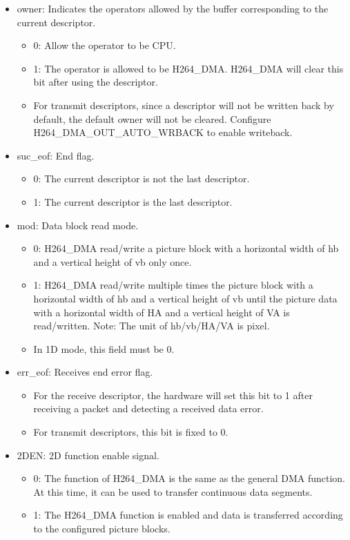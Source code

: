 \documentclass[main\_\_EN.tex]{subfiles}
\begin{document}
\begin{itemize}
\item owner: Indicates the operators allowed by the buffer corresponding to the current descriptor.
    \begin{itemize}
    \item 0: Allow the operator to be CPU.
    \item 1: The operator is allowed to be H264\_DMA. H264\_DMA will clear this bit after using the descriptor.
    \item For transmit descriptors, since a descriptor will not be written back by default, the default owner will not be cleared. Configure H264\_DMA\_OUT\_AUTO\_WRBACK to enable writeback.
    \end{itemize}

\item suc\_eof: End flag.
    \begin{itemize}
    \item 0: The current descriptor is not the last descriptor.
    \item 1: The current descriptor is the last descriptor.
    \end{itemize}
\item mod: Data block read mode.
    \begin{itemize}
    \item 0: H264\_DMA read/write a picture block with a horizontal width of hb and a vertical height of vb only once.
    \item 1: H264\_DMA read/write multiple times the picture block with a horizontal width of hb and a vertical height of vb until the picture data with a horizontal width of HA and a vertical height of VA is read/written. Note: The unit of hb/vb/HA/VA is pixel.
    \item In 1D mode, this field must be 0.
    \end{itemize}

\item err\_eof: Receives end error flag.
    \begin{itemize}
    \item For the receive descriptor, the hardware will set this bit to 1 after receiving a packet and detecting a received data error.
    \item For transmit descriptors, this bit is fixed to 0.
    \end{itemize}

\item 2DEN: 2D function enable signal.
    \begin{itemize}
    \item 0: The function of H264\_DMA is the same as the general DMA function. At this time, it can be used to transfer continuous data segments.
    \item 1: The H264\_DMA function is enabled and data is transferred according to the configured picture blocks.
    \end{itemize}


\end{itemize}
\end{document}
